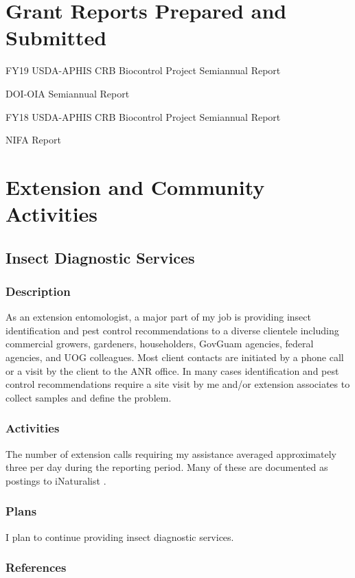 \section{Grant Reports Prepared and Submitted}
\begin{refsection}
FY19 USDA-APHIS CRB Biocontrol Project Semiannual Report

DOI-OIA Semiannual Report

FY18 USDA-APHIS CRB Biocontrol Project Semiannual Report

NIFA Report
	
\printbibliography[heading=none]
\end{refsection}







\section{Extension and Community Activities}

\subsection{Insect Diagnostic Services}
\begin{refsection}

\subsubsection{Description}	
As an extension entomologist, a major part of my job is providing
insect identification and pest control recommendations to a diverse
clientele including commercial growers, gardeners, householders, GovGuam
agencies, federal agencies, and UOG colleagues. Most client contacts
are initiated by a phone call or a visit by the client to the ANR
office. In many cases identification and pest control recommendations
require a site visit by me and/or extension associates to collect
samples and define the problem.

\subsubsection{Activities}

The number of extension calls requiring my assistance averaged approximately
three per day during the reporting period. Many of these are documented
as postings to iNaturalist \cite{moore_aubrey_2020}.

\subsubsection{Plans}

I plan to continue providing insect diagnostic services.

\subsubsection{References}
\printbibliography[heading=none]
\end{refsection}


